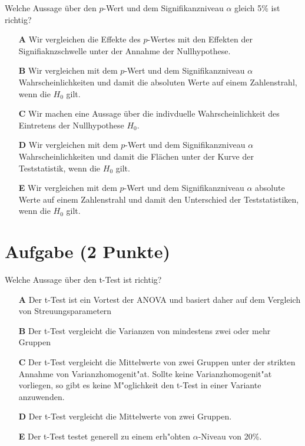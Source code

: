 \documentclass[a4paper, 10pt]{scrartcl}\usepackage[]{graphicx}\usepackage[]{xcolor}
\begin{document}
Welche Aussage über den $p$-Wert und dem Signifikanzniveau $\alpha$ gleich 5\% ist richtig?



\begin{enumerate}
\item [\textbf{A} \msquare] Wir vergleichen die Effekte des $p$-Wertes mit den Effekten der Signifiaknzschwelle unter der Annahme der Nullhypothese.
\item [\textbf{B} \msquare] Wir vergleichen mit dem $p$-Wert und dem Signifikanzniveau $\alpha$ Wahrscheinlichkeiten und damit die absoluten Werte auf einem Zahlenstrahl, wenn die $H_0$ gilt.
\item [\textbf{C} \msquare] Wir machen eine Aussage über die indivduelle Wahrscheinlichkeit des Eintretens der Nullhypothese $H_0$.
\item [\textbf{D} \msquare] Wir vergleichen mit dem $p$-Wert und dem Signifikanzniveau $\alpha$ Wahrscheinlichkeiten und damit die Flächen unter der Kurve der Teststatistik, wenn die $H_0$ gilt.
\item [\textbf{E} \msquare] Wir vergleichen mit dem $p$-Wert und dem Signifikanzniveau $\alpha$ absolute Werte auf einem Zahlenstrahl und damit den Unterschied der Teststatistiken, wenn die $H_0$ gilt.
\end{enumerate}

\section{Aufgabe \hfill (2 Punkte)}

Welche Aussage {\"u}ber den t-Test ist richtig?



\begin{enumerate}
\item [\textbf{A} \msquare] Der t-Test ist ein Vortest der ANOVA und basiert daher auf dem Vergleich von Streuungsparametern
\item [\textbf{B} \msquare] Der t-Test vergleicht die Varianzen von mindestens zwei oder mehr Gruppen
\item [\textbf{C} \msquare] Der t-Test vergleicht die Mittelwerte von zwei Gruppen unter der strikten Annahme von Varianzhomogenit{"a}t. Sollte keine Varianzhomogenit{"a}t vorliegen, so gibt es keine M{"o}glichkeit den t-Test in einer Variante anzuwenden.
\item [\textbf{D} \msquare] Der t-Test vergleicht die Mittelwerte von zwei Gruppen.
\item [\textbf{E} \msquare] Der t-Test testet generell zu einem erh{"o}hten $\alpha$-Niveau von 20\%.
\end{enumerate}    
\end{document}
